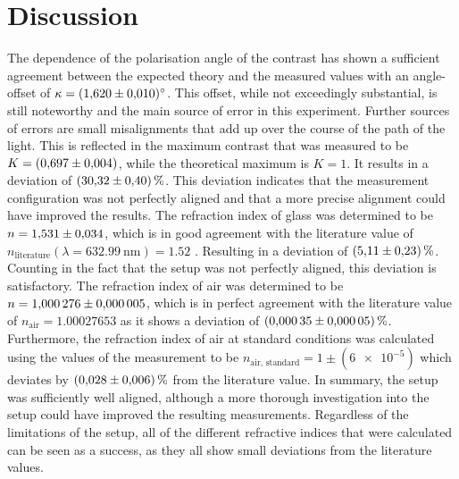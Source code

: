 \section{Discussion}
\label{sec:Discussion}

The dependence of the polarisation angle of the contrast has shown a sufficient agreement between the expected theory and the measured values with an angle-offset of $\kappa=\SI{1.620\pm 0.010}{\degree}$.
This offset, while not exceedingly substantial, is still noteworthy and the main source of error in this experiment.
Further sources of errors are small misalignments that add up over the course of the path of the light.
This is reflected in the maximum contrast that was measured to be $K= \SI{0.697\pm 0.004}{}$, while the theoretical maximum is $K=1$.
It results in a deviation of $\SI{30.32\pm0.4}{\percent}$. 
This deviation indicates that the measurement configuration was not perfectly aligned and that a more precise alignment could have improved the results. \newline
The refraction index of glass was determined to be $n=\num{1.531 \pm 0.034}$, which is in good agreement with the literature value of $n_{\text{literature}}(\lambda=\SI{632.99}{\nano\meter})=\num{1.52}$ \cite{RefractiveIndex}.
Resulting in a deviation of $\SI{5.11 (2.3)}{\percent}$.
Counting in the fact that the setup was not perfectly aligned, this deviation is satisfactory.
The refraction index of air was determined to be $n=\num{1.000276\pm0.000005}$, which is in perfect agreement with the literature value of $n_{\text{air}}=\num{1.00027653}$ \cite{RefractiveIndex} as it shows a deviation of $\SI{0.00035\pm0.00005}{\percent}$.
Furthermore, the refraction index of air at standard conditions was calculated using the values of the measurement to be $n_{\text{air, standard}}=1\pm(\num{6e-5})$ which deviates by $\SI{0.028 (0.006)}{\percent}$ from the literature value. \newline
In summary, the setup was sufficiently well aligned, although a more thorough investigation into the setup could have improved the resulting measurements.
Regardless of the limitations of the setup, all of the different refractive indices that were calculated can be seen as a success, as they all show small deviations from the literature values.